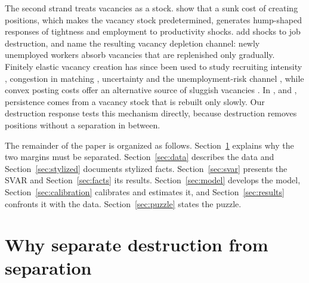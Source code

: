 \documentclass[authoryear, review, 12pt]{elsarticle}
\begin{document}
The second strand treats vacancies as a stock. \citet{fujita_2007} show that a sunk cost of creating positions, which makes the vacancy stock predetermined, generates hump-shaped responses of tightness and employment to productivity shocks. \citet{coles_2018} add shocks to job destruction, and \citet{haefke_2020} name the resulting vacancy depletion channel: newly unemployed workers absorb vacancies that are replenished only gradually. Finitely elastic vacancy creation has since been used to study recruiting intensity \citep{leduc_2020}, congestion in matching \citep{mercan_2024}, uncertainty \citep{den_haan_2021} and the unemployment-risk channel \citep{broer_2025}, while convex posting costs offer an alternative source of sluggish vacancies \citep{merz_2007}. In \citet{fujita_2007}, \citet{coles_2018} and \citet{haefke_2020}, persistence comes from a vacancy stock that is rebuilt only slowly. Our destruction response tests this mechanism directly, because destruction removes positions without a separation in between.

The remainder of the paper is organized as follows. Section~\ref{sec:beyond_ck} explains why the two margins must be separated. Section~\ref{sec:data} describes the data and Section~\ref{sec:stylized} documents stylized facts. Section~\ref{sec:svar} presents the SVAR and Section~\ref{sec:facts} its results. Section~\ref{sec:model} develops the model, Section~\ref{sec:calibration} calibrates and estimates it, and Section~\ref{sec:results} confronts it with the data. Section~\ref{sec:puzzle} states the puzzle.

\section{Why separate destruction from separation}\label{sec:beyond_ck}
\end{document}
